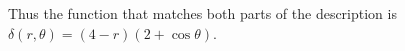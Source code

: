 \documentclass[12pt,letterpaper,noanswers]{exam}
\begin{document}
\begin{questions}
\begin{solution}
Thus the function that matches both parts of the description is $\delta(r,\theta) = (4-r)(2+\cos\theta)$.

 \end{solution}














\end{questions}
\end{document}
